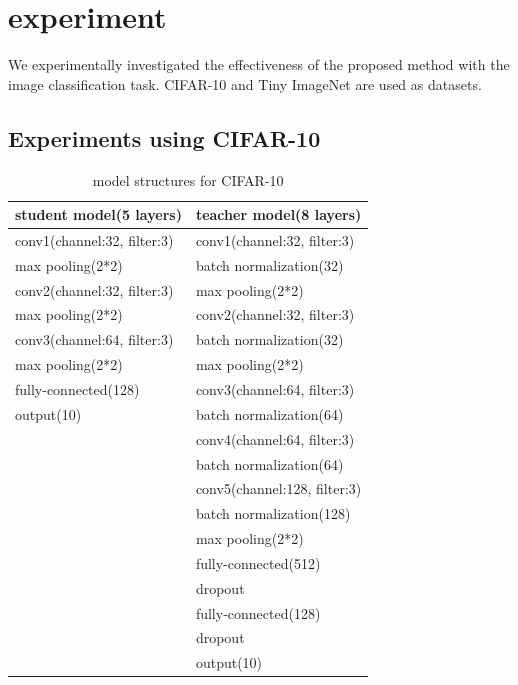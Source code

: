 \documentclass[conference]{IEEEtran}
\begin{document}
\section{experiment}





We experimentally investigated the effectiveness of the proposed method with the image classification task.
CIFAR-10 \cite{Krizhevsky2009} and Tiny ImageNet \cite{Le2015} are used as datasets.

\subsection{Experiments using CIFAR-10}

\begin{table}[ht] 
\caption{model structures for CIFAR-10}
\label{table:structure}
\begin{center}
\begin{tabular}{l|l} 
\hline
student model(5 layers) & teacher model(8 layers)   \\ \hline \hline
conv1(channel:32, filter:3) & conv1(channel:32, filter:3) \\
max pooling(2*2) & batch normalization(32) \\
conv2(channel:32, filter:3) & max pooling(2*2) \\
max pooling(2*2) & conv2(channel:32, filter:3) \\
conv3(channel:64, filter:3) & batch normalization(32) \\
max pooling(2*2) & max pooling(2*2) \\
fully-connected(128) & conv3(channel:64, filter:3) \\
output(10) & batch normalization(64) \\
 & conv4(channel:64, filter:3) \\
 & batch normalization(64) \\
 & conv5(channel:128, filter:3) \\
 &  batch normalization(128) \\
 & max pooling(2*2) \\
 & fully-connected(512) \\
 & dropout \\
 & fully-connected(128) \\
 & dropout \\
 & output(10) \\
\hline
\end{tabular}
\end{center}
\end{table}
\end{document}
